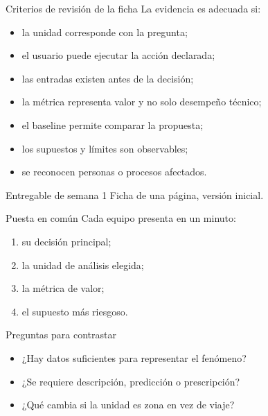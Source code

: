 \documentclass[aspectratio=169,11pt]{beamer}
\begin{document}
\begin{frame}{Criterios de revisión de la ficha}
  La evidencia es adecuada si:
  \begin{itemize}
    \item la unidad corresponde con la pregunta;
    \item el usuario puede ejecutar la acción declarada;
    \item las entradas existen antes de la decisión;
    \item la métrica representa valor y no solo desempeño técnico;
    \item el baseline permite comparar la propuesta;
    \item los supuestos y límites son observables;
    \item se reconocen personas o procesos afectados.
  \end{itemize}
  \begin{block}{Entregable de semana 1}
    Ficha de una página, versión inicial.
  \end{block}
\end{frame}

\begin{frame}{Puesta en común}
  Cada equipo presenta en un minuto:
  \begin{enumerate}
    \item su decisión principal;
    \item la unidad de análisis elegida;
    \item la métrica de valor;
    \item el supuesto más riesgoso.
  \end{enumerate}
  \vspace{0.5em}
  \begin{block}{Preguntas para contrastar}
    \begin{itemize}
      \item ¿Hay datos suficientes para representar el fenómeno?
      \item ¿Se requiere descripción, predicción o prescripción?
      \item ¿Qué cambia si la unidad es zona en vez de viaje?
    \end{itemize}
  \end{block}
\end{frame}
\end{document}
